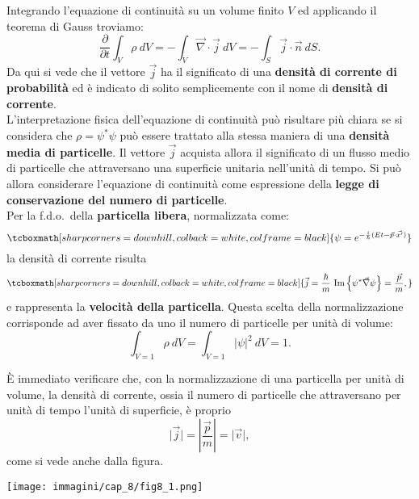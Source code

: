 \documentclass[a4paper,12pt,oneside]{book}
\begin{document}
Integrando l'equazione di continuità su un volume finito $V$ ed applicando il teorema di Gauss troviamo:
\begin{equation}
\frac{\partial }{\partial t} \int _V \rho\ dV = - \int _V \vec{\nabla}\cdot\vec{j}\ dV = -\int _S \vec{j}\cdot\vec{n}\ dS.
\end{equation}
Da qui si vede che il vettore $\vec{j}$ ha il significato di una \textbf{densità di corrente di probabilità} ed è indicato di solito semplicemente con il nome di \textbf{densità di corrente}.\\

L'interpretazione fisica dell'equazione di continuità può risultare più chiara se si considera che $\rho= \psi^* \psi$ può essere trattato alla stessa maniera di una \textbf{densità media di particelle}. Il vettore $\vec{j}$ acquista allora il significato di un flusso medio di particelle che attraversano una superficie unitaria nell'unità di tempo. Si può allora considerare l'equazione di continuità come espressione della \textbf{legge di conservazione del numero di particelle}.\\

Per la f.d.o.~della \textbf{particella libera}, normalizzata come:
	\begin{equation}
		\tcboxmath[sharp corners=downhill, colback=white, colframe=black]{
			\psi  =  e^{-\frac{i}{\hbar} (Et - \vec{p}\cdot \vec{x'})}
			}
	\end{equation}
la densità di corrente risulta
	\begin{equation}
		\tcboxmath[sharp corners=downhill, colback=white, colframe=black]{
			\vec{j}= \frac{\hbar}{m}\ \textrm{Im}\left\{\psi ^* \vec{\nabla}\psi \right\}= \frac{\vec{p}}{m},
			}
	\end{equation}
e rappresenta la \textbf{velocità della particella}. Questa scelta della normalizzazione corrisponde ad aver fissato da uno il numero di particelle per unità di volume:
	\begin{equation}
		\int _{V=1} \rho \ dV = \int _{V=1} \vert \psi \vert ^2 \ dV=1.
	\end{equation}
\begin{center}
\begin{tcolorbox}[toprule=3mm, width=.9\textwidth, colback=white]
È immediato verificare che, con la normalizzazione di una particella per unità di volume, la densità di corrente, ossia il numero di particelle che attraversano per unità di tempo l'unità di superficie, è proprio
\begin{equation}
\vert \vec{j} \vert= \left\vert \frac{\vec{p}}{m} \right\vert =\vert \vec{v} \vert ,
\end{equation}
come si vede anche dalla figura.
\begin{center}
\texttt{[image: immagini/cap\_8/fig8\_1.png]}
\end{center}
\end{tcolorbox}
\end{center}
\end{document}
